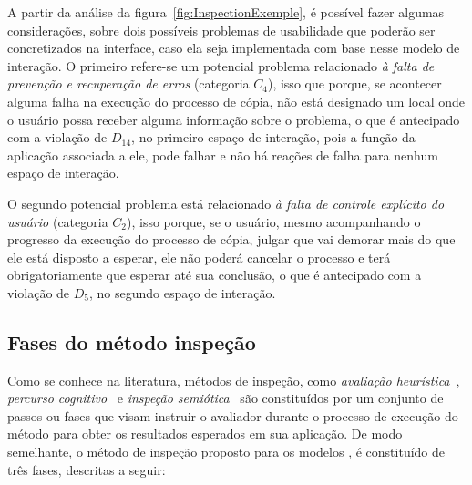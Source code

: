 A partir da  análise da figura~\ref{fig:InspectionExemple}, é possível
fazer  algumas  considerações,   sobre  dois  possíveis  problemas  de
usabilidade que poderão ser  concretizados na interface, caso ela seja
implementada com base nesse modelo de interação.  O primeiro refere-se
um  potencial  problema  relacionado  {\em  à  falta  de  prevenção  e
  recuperação  de  erros}  (categoria  $C_4$),  isso  que  porque,  se
acontecer  alguma falha  na execução  do processo  de cópia,  não está
designado  um local  onde o  usuário possa  receber  alguma informação
sobre o  problema, o que é  antecipado com a violação  de $D_{14}$, no
primeiro espaço de  interação, pois a função da  aplicação associada a
ele,  pode falhar  e não  há reações  de falha  para nenhum  espaço de
interação.

O segundo potencial problema está relacionado {\em à falta de controle
  explícito do usuário} (categoria  $C_2$), isso porque, se o usuário,
mesmo  acompanhando o  progresso  da execução  do  processo de  cópia,
julgar que  vai demorar mais do  que ele está disposto  a esperar, ele
não poderá cancelar o processo e terá obrigatoriamente que esperar até
sua conclusão, o que é antecipado  com a violação de $D_5$, no segundo
espaço de interação.

\subsection{Fases do método inspeção}
\label{inspectionMethod}

Como  se  conhece  na  literatura,  métodos  de  inspeção,  como  {\em
  avaliação     heurística}~\cite{Nielsen:1994},     {\em     percurso
  cognitivo}~\cite{Wharton:etal:1994}       e       {\em      inspeção
  semiótica}~\cite{deSouza:etal:2006} são constituídos por um conjunto
de passos ou  fases que visam instruir o  avaliador durante o processo
de  execução do  método  para  obter os  resultados  esperados em  sua
aplicação. De modo  semelhante, o método de inspeção  proposto para os
modelos \aladim, é constituído de três fases, descritas a seguir:

